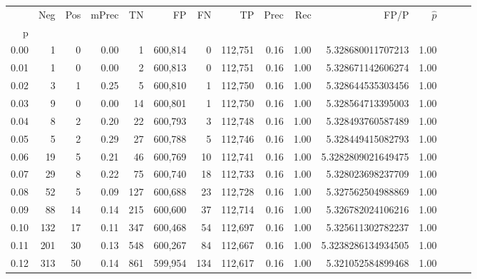 \begin{tabular}{rrrrrrrrrrrrrrr}
\toprule
{} &      Neg &     Pos & mPrec &       TN &       FP &       FN &       TP &  Prec &   Rec &                    FP/P & $\hat{p}$ \\
p    &          &         &       &          &          &          &          &       &       &                         &           \\
\midrule
0.00 &        1 &       0 &  0.00 &        1 &  600,814 &        0 &  112,751 &  0.16 &  1.00 &       5.328680011707213 &      1.00 \\
0.01 &        1 &       0 &  0.00 &        2 &  600,813 &        0 &  112,751 &  0.16 &  1.00 &       5.328671142606274 &      1.00 \\
0.02 &        3 &       1 &  0.25 &        5 &  600,810 &        1 &  112,750 &  0.16 &  1.00 &       5.328644535303456 &      1.00 \\
0.03 &        9 &       0 &  0.00 &       14 &  600,801 &        1 &  112,750 &  0.16 &  1.00 &       5.328564713395003 &      1.00 \\
0.04 &        8 &       2 &  0.20 &       22 &  600,793 &        3 &  112,748 &  0.16 &  1.00 &       5.328493760587489 &      1.00 \\
0.05 &        5 &       2 &  0.29 &       27 &  600,788 &        5 &  112,746 &  0.16 &  1.00 &       5.328449415082793 &      1.00 \\
0.06 &       19 &       5 &  0.21 &       46 &  600,769 &       10 &  112,741 &  0.16 &  1.00 &      5.3282809021649475 &      1.00 \\
0.07 &       29 &       8 &  0.22 &       75 &  600,740 &       18 &  112,733 &  0.16 &  1.00 &       5.328023698237709 &      1.00 \\
0.08 &       52 &       5 &  0.09 &      127 &  600,688 &       23 &  112,728 &  0.16 &  1.00 &       5.327562504988869 &      1.00 \\
0.09 &       88 &      14 &  0.14 &      215 &  600,600 &       37 &  112,714 &  0.16 &  1.00 &       5.326782024106216 &      1.00 \\
0.10 &      132 &      17 &  0.11 &      347 &  600,468 &       54 &  112,697 &  0.16 &  1.00 &       5.325611302782237 &      1.00 \\
0.11 &      201 &      30 &  0.13 &      548 &  600,267 &       84 &  112,667 &  0.16 &  1.00 &      5.3238286134934505 &      1.00 \\
0.12 &      313 &      50 &  0.14 &      861 &  599,954 &      134 &  112,617 &  0.16 &  1.00 &       5.321052584899468 &      1.00 \\

\end{tabular}
